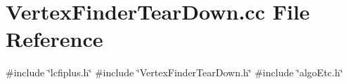 \section{Vertex\+Finder\+Tear\+Down.\+cc File Reference}
\label{VertexFinderTearDown_8cc}
{\ttfamily \#include \char`\"{}lcfiplus.\+h\char`\"{}}\newline
{\ttfamily \#include \char`\"{}Vertex\+Finder\+Tear\+Down.\+h\char`\"{}}\newline
{\ttfamily \#include \char`\"{}algo\+Etc.\+h\char`\"{}}\newline
